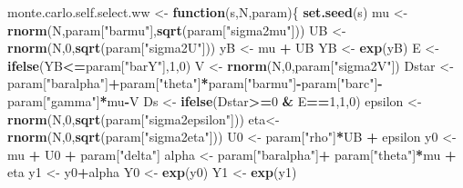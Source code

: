 \documentclass[]{book}
\newenvironment{Shaded}{\begin{snugshade}}{\end{snugshade}}
\newcommand{\KeywordTok}[1]{\textcolor[rgb]{0.13,0.29,0.53}{\textbf{#1}}}
\newcommand{\DecValTok}[1]{\textcolor[rgb]{0.00,0.00,0.81}{#1}}
\newcommand{\StringTok}[1]{\textcolor[rgb]{0.31,0.60,0.02}{#1}}
\newcommand{\ControlFlowTok}[1]{\textcolor[rgb]{0.13,0.29,0.53}{\textbf{#1}}}
\newcommand{\OperatorTok}[1]{\textcolor[rgb]{0.81,0.36,0.00}{\textbf{#1}}}
\newcommand{\NormalTok}[1]{#1}
\theoremstyle{definition}
\theoremstyle{definition}
\theoremstyle{definition}
\theoremstyle{remark}
\begin{document}
\begin{Shaded}
\begin{Highlighting}[]
\NormalTok{monte.carlo.self.select.ww <-}\StringTok{ }\ControlFlowTok{function}\NormalTok{(s,N,param)\{}
  \KeywordTok{set.seed}\NormalTok{(s)}
\NormalTok{  mu <-}\StringTok{ }\KeywordTok{rnorm}\NormalTok{(N,param[}\StringTok{"barmu"}\NormalTok{],}\KeywordTok{sqrt}\NormalTok{(param[}\StringTok{"sigma2mu"}\NormalTok{]))}
\NormalTok{  UB <-}\StringTok{ }\KeywordTok{rnorm}\NormalTok{(N,}\DecValTok{0}\NormalTok{,}\KeywordTok{sqrt}\NormalTok{(param[}\StringTok{"sigma2U"}\NormalTok{]))}
\NormalTok{  yB <-}\StringTok{ }\NormalTok{mu }\OperatorTok{+}\StringTok{ }\NormalTok{UB }
\NormalTok{  YB <-}\StringTok{ }\KeywordTok{exp}\NormalTok{(yB)}
\NormalTok{  E <-}\StringTok{ }\KeywordTok{ifelse}\NormalTok{(YB}\OperatorTok{<=}\NormalTok{param[}\StringTok{"barY"}\NormalTok{],}\DecValTok{1}\NormalTok{,}\DecValTok{0}\NormalTok{)}
\NormalTok{  V <-}\StringTok{ }\KeywordTok{rnorm}\NormalTok{(N,}\DecValTok{0}\NormalTok{,param[}\StringTok{"sigma2V"}\NormalTok{])}
\NormalTok{  Dstar <-}\StringTok{ }\NormalTok{param[}\StringTok{"baralpha"}\NormalTok{]}\OperatorTok{+}\NormalTok{param[}\StringTok{"theta"}\NormalTok{]}\OperatorTok{*}\NormalTok{param[}\StringTok{"barmu"}\NormalTok{]}\OperatorTok{-}\NormalTok{param[}\StringTok{"barc"}\NormalTok{]}\OperatorTok{-}\NormalTok{param[}\StringTok{"gamma"}\NormalTok{]}\OperatorTok{*}\NormalTok{mu}\OperatorTok{-}\NormalTok{V}
\NormalTok{  Ds <-}\StringTok{ }\KeywordTok{ifelse}\NormalTok{(Dstar}\OperatorTok{>=}\DecValTok{0} \OperatorTok{&}\StringTok{ }\NormalTok{E}\OperatorTok{==}\DecValTok{1}\NormalTok{,}\DecValTok{1}\NormalTok{,}\DecValTok{0}\NormalTok{)}
\NormalTok{  epsilon <-}\StringTok{ }\KeywordTok{rnorm}\NormalTok{(N,}\DecValTok{0}\NormalTok{,}\KeywordTok{sqrt}\NormalTok{(param[}\StringTok{"sigma2epsilon"}\NormalTok{]))}
\NormalTok{  eta<-}\StringTok{ }\KeywordTok{rnorm}\NormalTok{(N,}\DecValTok{0}\NormalTok{,}\KeywordTok{sqrt}\NormalTok{(param[}\StringTok{"sigma2eta"}\NormalTok{]))}
\NormalTok{  U0 <-}\StringTok{ }\NormalTok{param[}\StringTok{"rho"}\NormalTok{]}\OperatorTok{*}\NormalTok{UB }\OperatorTok{+}\StringTok{ }\NormalTok{epsilon}
\NormalTok{  y0 <-}\StringTok{ }\NormalTok{mu }\OperatorTok{+}\StringTok{  }\NormalTok{U0 }\OperatorTok{+}\StringTok{ }\NormalTok{param[}\StringTok{"delta"}\NormalTok{]}
\NormalTok{  alpha <-}\StringTok{ }\NormalTok{param[}\StringTok{"baralpha"}\NormalTok{]}\OperatorTok{+}\StringTok{  }\NormalTok{param[}\StringTok{"theta"}\NormalTok{]}\OperatorTok{*}\NormalTok{mu }\OperatorTok{+}\StringTok{ }\NormalTok{eta}
\NormalTok{  y1 <-}\StringTok{ }\NormalTok{y0}\OperatorTok{+}\NormalTok{alpha}
\NormalTok{  Y0 <-}\StringTok{ }\KeywordTok{exp}\NormalTok{(y0)}
\NormalTok{  Y1 <-}\StringTok{ }\KeywordTok{exp}\NormalTok{(y1)}
  

\end{Highlighting}
\end{Shaded}
\end{document}
